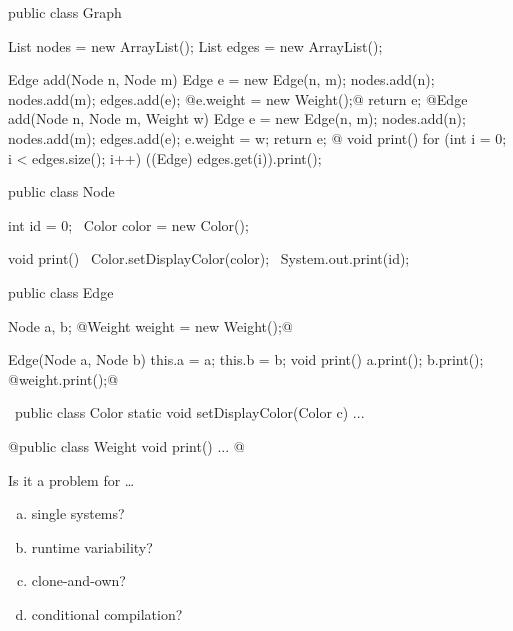 
\begin{frame}[fragile]{\myframetitle}
	\small\begin{mycolumns}[columns=3,T,animation=none,widths={43,32}]
\begin{codetight}{}
public class Graph {
	List nodes = new ArrayList();
	List edges = new ArrayList();

	Edge add(Node n, Node m) {
		Edge e = new Edge(n, m);
		nodes.add(n); nodes.add(m); edges.add(e);
		@e.weight = new Weight();@
		return e;
	}
	@Edge add(Node n, Node m, Weight w) {
		Edge e = new Edge(n, m);
		nodes.add(n); nodes.add(m); edges.add(e);
		e.weight = w;
		return e;
	}@
	void print() {
		for (int i = 0; i < edges.size(); i++) {
			((Edge) edges.get(i)).print();
		}
	}
}
\end{codetight}
		\mynextcolumn
\begin{codetight}{}
public class Node {
	int id = 0;
	~Color color = new Color();~

	void print() {
		~Color.setDisplayColor(color);~
		System.out.print(id);
	}
}
\end{codetight}
\begin{codetight}{}
public class Edge {
	Node a, b;
	@Weight weight = new Weight();@

	Edge(Node a, Node b) {
		this.a = a; this.b = b;
	}
	void print() {
		a.print(); b.print();
		@weight.print();@
	}
}
\end{codetight}
		\mynextcolumn
\begin{codetight}{}
~public class Color {
	static void setDisplayColor(Color c) {...}
}~
\end{codetight}	
\begin{codetight}{}
@public class Weight {
	void print() {...}
}@
\end{codetight}
		\pause
		\begin{note}{Is it a problem for \ldots}
			\setlength\leftmargini{4mm}
			\begin{enumerate}[(a)]
				\item single systems? 
				\item runtime variability? {\tiny\lectureruntime}
				\item clone-and-own? {\tiny\lecturecloneandown}
				\item conditional compilation? {\tiny\lecturefeatures}
			\end{enumerate}
		\end{note}
	\end{mycolumns}
\end{frame}

